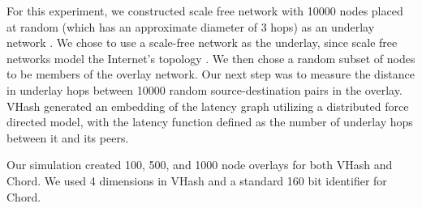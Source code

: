 For this experiment, we constructed scale free network with 10000 nodes placed at random (which has an approximate diameter of 3 hops) as an underlay network \cite{cohen2000resilience} \cite{pastor2001epidemic} \cite{hagberg2004}.
We chose to use a scale-free network as the underlay, since  scale free networks model the Internet's topology \cite{cohen2000resilience} \cite{pastor2001epidemic}.
We then chose a random subset of nodes to be members of the overlay network.
Our next step was to measure the distance in underlay hops between 10000 random source-destination pairs in the overlay.
VHash generated an embedding of the latency graph utilizing a distributed force directed model, with the latency function defined as the number of underlay hops between it and its peers.

Our simulation created 100, 500, and 1000 node overlays for both VHash and Chord.
We used 4 dimensions in VHash and a standard 160 bit identifier for Chord.




